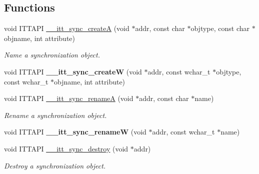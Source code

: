 \subsection*{Functions}
\begin{DoxyCompactItemize}
\item 
void I\+T\+T\+A\+P\+I \hyperlink{group__sync_ga243666487ff4b8904f1629fa15782af4}{\+\_\+\+\_\+itt\+\_\+sync\+\_\+create\+A} (void $\ast$addr, const char $\ast$objtype, const char $\ast$objname, int attribute)
\begin{DoxyCompactList}\small\item\em Name a synchronization object. \end{DoxyCompactList}\item 
\hypertarget{group__sync_ga994a2467bd0fd12e7f32fb12ea4b525b}{}void I\+T\+T\+A\+P\+I {\bfseries \+\_\+\+\_\+itt\+\_\+sync\+\_\+create\+W} (void $\ast$addr, const wchar\+\_\+t $\ast$objtype, const wchar\+\_\+t $\ast$objname, int attribute)\label{group__sync_ga994a2467bd0fd12e7f32fb12ea4b525b}

\item 
void I\+T\+T\+A\+P\+I \hyperlink{group__sync_ga8e0ee60520e20d33f9dce510b978bb3b}{\+\_\+\+\_\+itt\+\_\+sync\+\_\+rename\+A} (void $\ast$addr, const char $\ast$name)
\begin{DoxyCompactList}\small\item\em Rename a synchronization object. \end{DoxyCompactList}\item 
\hypertarget{group__sync_gac31e3b71fb178b0732224de292847de9}{}void I\+T\+T\+A\+P\+I {\bfseries \+\_\+\+\_\+itt\+\_\+sync\+\_\+rename\+W} (void $\ast$addr, const wchar\+\_\+t $\ast$name)\label{group__sync_gac31e3b71fb178b0732224de292847de9}

\item 
void I\+T\+T\+A\+P\+I \hyperlink{group__sync_ga7c1ea8b984f5f59e077c087a46b4708d}{\+\_\+\+\_\+itt\+\_\+sync\+\_\+destroy} (void $\ast$addr)
\begin{DoxyCompactList}\small\item\em Destroy a synchronization object. \end{DoxyCompactList}\end{DoxyCompactItemize}
